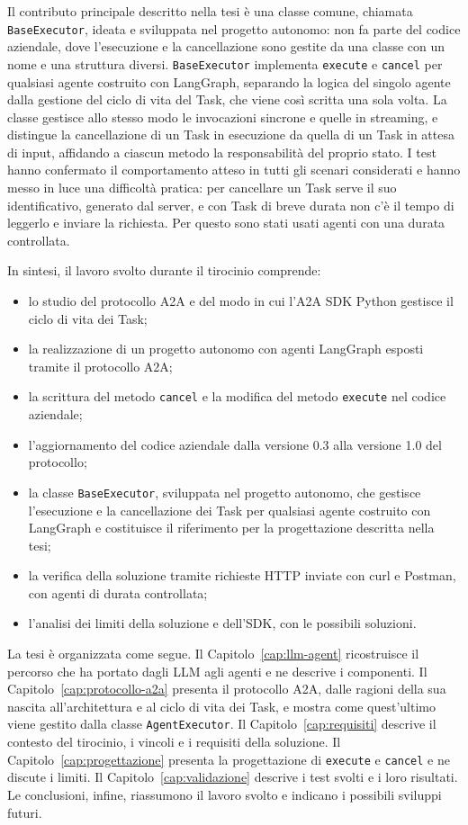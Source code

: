 Il contributo principale descritto nella tesi è una classe comune, chiamata \texttt{BaseExecutor}, ideata e sviluppata nel progetto autonomo: non fa parte del codice aziendale, dove l'esecuzione e la cancellazione sono gestite da una classe con un nome e una struttura diversi. \texttt{BaseExecutor} implementa \texttt{execute} e \texttt{cancel} per qualsiasi agente costruito con LangGraph, separando la logica del singolo agente dalla gestione del ciclo di vita del Task, che viene così scritta una sola volta. La classe gestisce allo stesso modo le invocazioni sincrone e quelle in streaming, e distingue la cancellazione di un Task in esecuzione da quella di un Task in attesa di input, affidando a ciascun metodo la responsabilità del proprio stato. I test hanno confermato il comportamento atteso in tutti gli scenari considerati e hanno messo in luce una difficoltà pratica: per cancellare un Task serve il suo identificativo, generato dal server, e con Task di breve durata non c'è il tempo di leggerlo e inviare la richiesta. Per questo sono stati usati agenti con una durata controllata.

In sintesi, il lavoro svolto durante il tirocinio comprende:

\begin{itemize}
    \item lo studio del protocollo A2A e del modo in cui l'A2A SDK Python gestisce il ciclo di vita dei Task;
    \item la realizzazione di un progetto autonomo con agenti LangGraph esposti tramite il protocollo A2A;
    \item la scrittura del metodo \texttt{cancel} e la modifica del metodo \texttt{execute} nel codice aziendale;
    \item l'aggiornamento del codice aziendale dalla versione 0.3 alla versione 1.0 del protocollo;
    \item la classe \texttt{BaseExecutor}, sviluppata nel progetto autonomo, che gestisce l'esecuzione e la cancellazione dei Task per qualsiasi agente costruito con LangGraph e costituisce il riferimento per la progettazione descritta nella tesi;
    \item la verifica della soluzione tramite richieste HTTP inviate con curl e Postman, con agenti di durata controllata;
    \item l'analisi dei limiti della soluzione e dell'SDK, con le possibili soluzioni.
\end{itemize}

La tesi è organizzata come segue. Il Capitolo~\ref{cap:llm-agent} ricostruisce il percorso che ha portato dagli LLM agli agenti e ne descrive i componenti.
Il Capitolo~\ref{cap:protocollo-a2a} presenta il protocollo A2A, dalle ragioni della sua nascita all'architettura e al ciclo di vita dei Task, e mostra come
quest'ultimo viene gestito dalla classe \texttt{AgentExecutor}. Il Capitolo~\ref{cap:requisiti} descrive il contesto del tirocinio, i vincoli e i requisiti
della soluzione. Il Capitolo~\ref{cap:progettazione} presenta la progettazione di \texttt{execute} e \texttt{cancel} e ne discute i limiti.
Il Capitolo~\ref{cap:validazione} descrive i test svolti e i loro risultati. Le conclusioni, infine, riassumono il lavoro svolto e indicano i possibili
sviluppi futuri.
